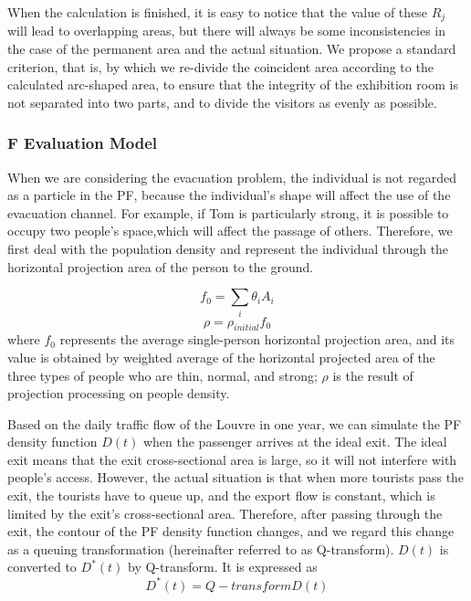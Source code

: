 When the calculation is finished, it is easy to notice that the value of these ${R_j}$ will lead to overlapping areas, but there will always be some inconsistencies in the case of the permanent area and the actual situation. We propose a standard criterion, that is, by which we re-divide the coincident area according to the calculated arc-shaped area, to ensure that the integrity of the exhibition room is not separated into two parts, and to divide the visitors as evenly as possible.

\subsubsection{F Evaluation Model}

When we are considering the evacuation problem, the individual is not regarded as a particle in the PF, because the individual's shape will affect the use of the evacuation channel. For example, if Tom is particularly strong, it is possible to occupy two people's space,which will affect the passage of others. Therefore, we first deal with the population density and represent the individual through the horizontal projection area of the person to the ground.

\[
f_0=\sum_i\theta_iA_i
\]
\begin{equation}
\rho=\rho_{initial}f_0
\end{equation}
where $f_0$ represents the average single-person horizontal projection area, and its value is obtained by weighted average of the horizontal projected area of the three types of people who are thin, normal, and strong; $\rho$ is the result of projection processing on people density.

Based on the daily traffic flow of the Louvre in one year, we can simulate the PF density function $D(t)$ when the passenger arrives at the ideal exit. The ideal exit means that the exit cross-sectional area is large, so it will not interfere with people's access. However, the actual situation is that when more tourists pass the exit, the tourists have to queue up, and the export flow is constant, which is limited by the exit's cross-sectional area. Therefore, after passing through the exit, the contour of the PF density function changes, and we regard this change as a queuing transformation (hereinafter referred to as Q-transform). $D(t)$ is converted to $D^*(t)$ by Q-transform. It is expressed as
\begin{equation}
    D^*(t)=Q-transform{D(t)}
\end{equation}

